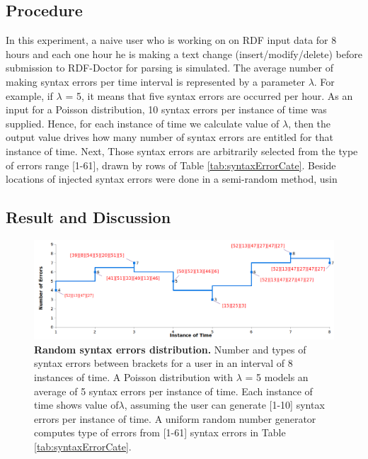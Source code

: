 \subsection{Procedure}
 In this experiment, a naive user who is working on on RDF input data for 8 hours and each one hour he is making a text change (insert/modify/delete) before submission to RDF-Doctor for parsing is simulated. The average number of making syntax errors per time interval is represented by a parameter $\lambda$. For example, if   $\lambda$ = 5, it means that five syntax errors are occurred per hour.  As an input for a Poisson distribution, 10 syntax errors per instance of time was supplied. Hence, for each instance of time we calculate value of $\lambda$, then the output value drives how many number of syntax errors are entitled for that instance of time. Next, Those syntax errors are arbitrarily selected from the type of errors range [1-61], drawn by rows of Table \ref{tab:syntaxErrorCate}. Beside locations of injected syntax errors were done in a semi-random method, usin  

\subsection{Result and Discussion}



	\begin{figure}[ht]
	\begin{center}
		\includegraphics[scale=0.45,angle=0]{images/Experiment02-01.png}
		\setlength\belowcaptionskip{-5mm}
		\caption{\textbf{Random syntax errors distribution.} Number and types of syntax errors between brackets for a user in an interval of 8 instances of time. A Poisson  distribution with $\lambda$ = 5 models an average of 5 syntax errors per instance of time. Each instance of time shows value of$\lambda$, assuming the user can generate [1-10] syntax errors per instance of time. A uniform random number generator computes type of errors from [1-61] syntax errors in Table \ref{tab:syntaxErrorCate}.} 
		\label{Fig:experiment2}
	\end{center}
\end{figure}



